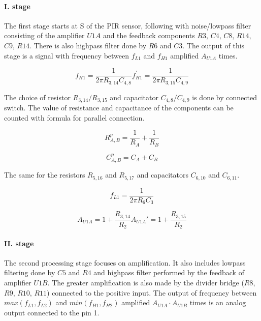 \paragraph{I. stage}
The first stage starts at S of the PIR sensor, following with noise/lowpass filter consisting
of the amplifier $U1A$ and the feedback components $R3$, $C4$, $C8$, $R14$, $C9$, $R14$.
There is also highpass filter done by $R6$ and $C3$. The output of this stage is a signal
with frequency between $f_{L1}$ and $f_{H1}$ amplified $A_{U1A}$ times.

\begin{subequations}
\begin{equation}
f_{H1} = \frac{1}{2 \pi R_{3,14} C_{4,8}}
\end{equation}

\begin{equation}
f_{H1}^{'} = \frac{1}{2 \pi R_{3,15} C_{4,9}}
\end{equation}
\end{subequations}

The choice of resistor $R_{3,14} / R_{3,15}$ and capacitator $C_{4,8} / C_{4,9}$ is done by
connected switch. The value of resistance and capacitance of the components can be counted
with formula for parallel connection.

\begin{equation}
R_{A,B}^{p} = \frac{1}{R_A} + \frac{1}{R_B}
\end{equation}

\begin{equation}
C_{A,B}^{p} = C_A + C_B
\end{equation}

The same for the resistors $R_{5,16}$ and $R_{5,17}$ and capacitators $C_{6,10}$ and $C_{6,11}$.

\begin{equation}
f_{L1} = \frac{1}{2 \pi R_6 C_3}
\end{equation}

\begin{subequations}
\begin{equation}
A_{U1A} = 1 + \frac{R_{3,14}}{R_2}
\end{equation}
\begin{equation}
A_{U1A}' = 1 + \frac{R_{3,15}}{R_2}
\end{equation}
\end{subequations}

\paragraph{II. stage}
The second processing stage focuses on amplification. It also includes lowpass filtering done
by $C5$ and $R4$ and highpass filter performed by the feedback of amplifier $U1B$. The greater
amplification is also made by the divider bridge ($R8$, $R9$, $R10$, $R11$) connected to the
positive input. The output of frequency between $max(f_{L1}, f_{L2})$ and $min(f_{H1}, f_{H2})$
amplified $A_{U1A} \cdot A_{U1B}$ times is an analog output connected to the pin 1.

